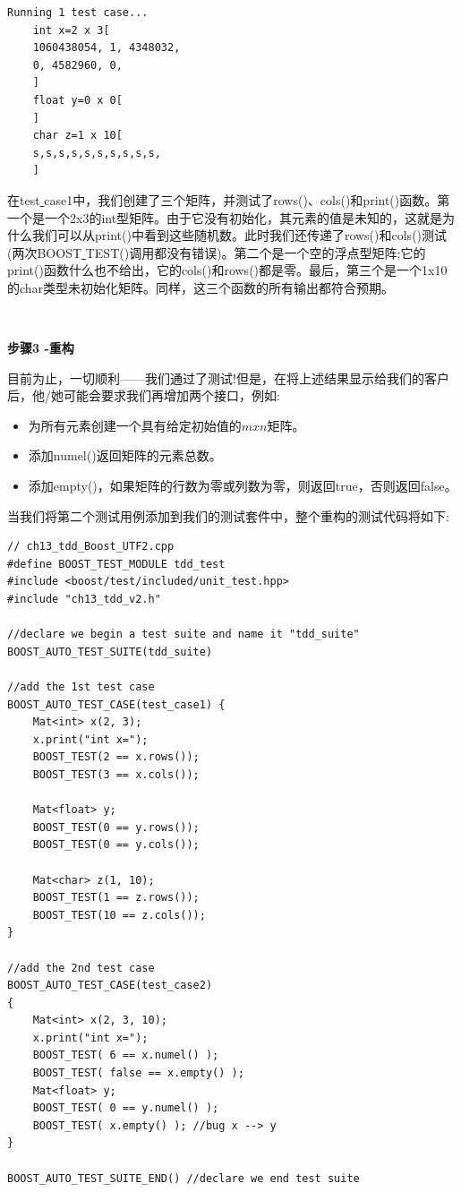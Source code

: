 \begin{lstlisting}[caption={}]
Running 1 test case...
	int x=2 x 3[
	1060438054, 1, 4348032,
	0, 4582960, 0,
	]
	float y=0 x 0[
	]
	char z=1 x 10[
	s,s,s,s,s,s,s,s,s,s,
	]
\end{lstlisting}

在test\underline{ }case1中，我们创建了三个矩阵，并测试了rows()、cols()和print()函数。第一个是一个2x3的int型矩阵。由于它没有初始化，其元素的值是未知的，这就是为什么我们可以从print()中看到这些随机数。此时我们还传递了rows()和cols()测试(两次BOOST\underline{ }TEST()调用都没有错误)。第二个是一个空的浮点型矩阵;它的print()函数什么也不给出，它的cols()和rows()都是零。最后，第三个是一个1x10的char类型未初始化矩阵。同样，这三个函数的所有输出都符合预期。 \par

\noindent\textbf{}\ \par
\textbf{步骤3 -重构} \ \par
目前为止，一切顺利——我们通过了测试!但是，在将上述结果显示给我们的客户后，他/她可能会要求我们再增加两个接口，例如: \par

\begin{itemize}
	\item 为所有元素创建一个具有给定初始值的$ m x n $矩阵。
	\item 添加numel()返回矩阵的元素总数。
	\item 添加empty()，如果矩阵的行数为零或列数为零，则返回true，否则返回false。
\end{itemize}

当我们将第二个测试用例添加到我们的测试套件中，整个重构的测试代码将如下: \par

\begin{lstlisting}[caption={}]
// ch13_tdd_Boost_UTF2.cpp
#define BOOST_TEST_MODULE tdd_test
#include <boost/test/included/unit_test.hpp>
#include "ch13_tdd_v2.h"

//declare we begin a test suite and name it "tdd_suite"
BOOST_AUTO_TEST_SUITE(tdd_suite)

//add the 1st test case
BOOST_AUTO_TEST_CASE(test_case1) {
	Mat<int> x(2, 3);
	x.print("int x=");
	BOOST_TEST(2 == x.rows());
	BOOST_TEST(3 == x.cols());
	
	Mat<float> y;
	BOOST_TEST(0 == y.rows());
	BOOST_TEST(0 == y.cols());
	
	Mat<char> z(1, 10);
	BOOST_TEST(1 == z.rows());
	BOOST_TEST(10 == z.cols());
}

//add the 2nd test case
BOOST_AUTO_TEST_CASE(test_case2)
{
	Mat<int> x(2, 3, 10);
	x.print("int x=");
	BOOST_TEST( 6 == x.numel() );
	BOOST_TEST( false == x.empty() );
	Mat<float> y;
	BOOST_TEST( 0 == y.numel() );
	BOOST_TEST( x.empty() ); //bug x --> y
}

BOOST_AUTO_TEST_SUITE_END() //declare we end test suite
\end{lstlisting}

